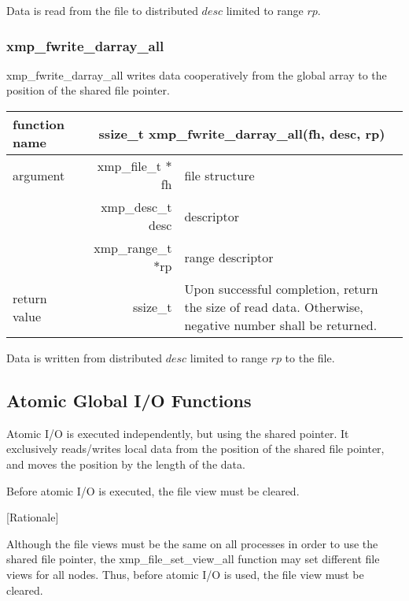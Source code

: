    Data is read from the file to distributed $desc$ limited to range $rp$.

   \subsubsection{xmp\_fwrite\_darray\_all}
   xmp\_fwrite\_darray\_all writes data cooperatively from the global array to the
   position of the shared file pointer.

   \begin{table}[h]
    \begin{center}
     \begin{tabular}{|l|r|p{80mm}|}
      \hline
      {\bf function name}  & \multicolumn{2}{c|}{\bf ssize\_t
      xmp\_fwrite\_darray\_all(fh, desc, rp)} \\ \hline \hline
      argument & xmp\_file\_t $*$fh & file structure \\ \cline{2-3}
      & xmp\_desc\_t desc & descriptor \\ \cline{2-3}
      & xmp\_range\_t $*$rp & range descriptor \\ \hline
      return value & ssize\_t & Upon successful completion, return the size
	      of read data. Otherwise, negative number shall be
	      returned. \\ \hline
      \end{tabular}
     \end{center}
    \label{tb:aaa}
   \end{table}

   Data is written from distributed $desc$ limited to range $rp$ to the file.


   \subsection{Atomic Global I/O Functions}

   Atomic I/O is executed independently, but using the shared pointer. 
   It exclusively reads/writes local data
   from the position of the shared file pointer, and moves the position
   by the length of the data.

   Before atomic I/O is executed, the file view must be cleared.
   
   [Rationale]

   Although the file views must be the same on all processes in order to
   use the shared file pointer, the xmp\_file\_set\_view\_all
   function may set different file views for all nodes.
   Thus, before atomic I/O is used, the file view must be cleared.

